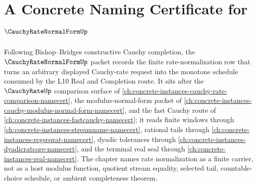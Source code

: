 \chapter{A Concrete Naming Certificate for $\CauchyRateNormalFormUp$}
\label{ch:concrete-instances-cauchy-rate-normal-form-namecert}

Following Bishop--Bridges constructive Cauchy completion, the $\CauchyRateNormalFormUp$ packet records the finite rate-normalization row that turns an arbitrary displayed Cauchy-rate request into the monotone schedule consumed by the L10 Real and Completion route. It sits after the $\CauchyRateUp$ comparison surface of \autoref{ch:concrete-instances-cauchy-rate-comparison-namecert}, the modulus-normal-form packet of \autoref{ch:concrete-instances-cauchy-modulus-normal-form-namecert}, and the fast Cauchy route of \autoref{ch:concrete-instances-fastcauchy-namecert}; it reads finite windows through \autoref{ch:concrete-instances-streamname-namecert}, rational tails through \autoref{ch:concrete-instances-regseqrat-namecert}, dyadic tolerances through \autoref{ch:concrete-instances-dyadicratcore-namecert}, and the terminal real seal through \autoref{ch:concrete-instances-real-namecert}. The chapter names rate normalization as a finite carrier, not as a host modulus function, quotient stream equality, selected tail, countable-choice schedule, or ambient completeness theorem.

